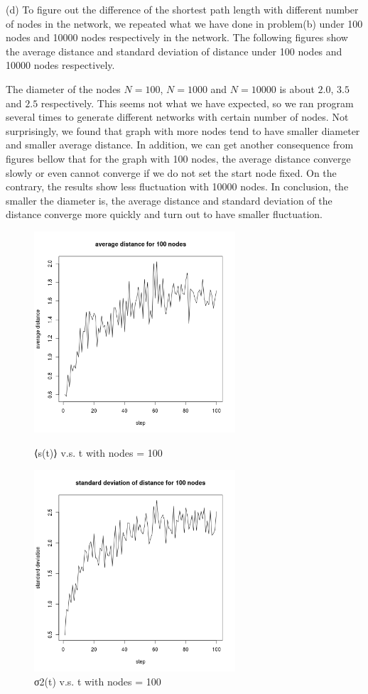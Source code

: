 \documentclass[draftcls,12pt,onecolumn]{IEEEtran}
\begin{document}
(d) To figure out the difference of the shortest path length with different number of nodes in the network, we repeated what we have done in problem(b) under 100 nodes and 10000 nodes respectively in the network. The following figures show the average distance and standard deviation of distance under 100 nodes and 10000 nodes respectively.

The diameter of the nodes $N = 100$, $N = 1000$ and $N = 10000$ is about $2.0$, $3.5$ and $2.5$ respectively. This seems not what we have expected, so we ran program several times to generate different networks with certain number of nodes. Not surprisingly, we found that graph with more nodes tend to have smaller diameter and smaller average distance. In addition, we can get another consequence from figures bellow that for the graph with 100 nodes, the average distance converge slowly or even cannot converge if we do not set the start node fixed. On the contrary, the results show less fluctuation with 10000 nodes. In conclusion, the smaller the diameter is, the average distance and standard deviation of the distance converge more quickly and turn out to have smaller fluctuation. 
\begin{figure}[htbp]
\centering
\begin{minipage}[t]{0.48\textwidth}
\centering
\includegraphics[width=7.5cm]{2_1_d_100_distance.png}
\caption{⟨s(t)⟩ v.s. t with nodes = 100}
\label{fig05}
\end{minipage}
\begin{minipage}[t]{0.48\textwidth}
\centering
\includegraphics[width=7.5cm]{2_1_d_100_deviation.png}
\caption{σ2(t) v.s. t with nodes = 100}
\label{fig06}
\end{minipage}
\end{figure}
\end{document}
